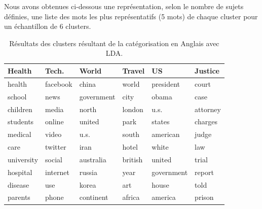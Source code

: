     Nous avons obtenues ci-dessous une représentation, selon le nombre de sujets définies, une liste des mots les plus représentatifs (5 mots) de chaque cluster pour un échantillon de 6 clusters.
    \begin{table}[H]
        \begin{center}
            \begin{tabular}{|C{2.1cm}|C{2.1cm}|C{2.1cm}|C{2.1cm}|C{2.1cm}|C{2.1cm}|}
                \hline                      
                \textbf{Health} & \textbf{Tech.} & \textbf{World} & \textbf{Travel} & \textbf{US} & \textbf{Justice}\\ 
                \hline     
                health &  facebook &         china  &    world  &     president   &   court \\
                school  &     news  &   government  &     city     &      obama  &     case \\
                children  &    media   &       north  &   london     &       u.s.  & attorney \\  
                students  &   online   &      united  &     park     &     states  &  charges \\  
                medical  &    video   &        u.s.  &    south     &   american  &    judge \\  
                care  &  twitter   &        iran  &    hotel     &      white  &      law \\  
                university  &   social   &      australia  &  british     &     united  & trial \\ 
                hospital &  internet   &      russia   &    year   &   government  &   report \\  
                disease   &     use   &       korea   &     art & house  &    told  \\  
                parents   &   phone & continent &   africa    &     america  &   prison \\  
                \hline
                
            \end{tabular}
        \end{center}
        \caption{Résultats des clusters résultant de la catégorisation en Anglais avec LDA.}
        \label{Lda-categ}
    \end{table}                           

